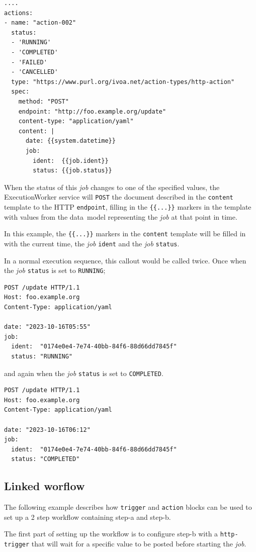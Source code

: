 \documentclass[11pt,a4paper]{ivoa}
\newcommand{\datamodel} {data~model}
\newcommand{\execworkerclass} {ExecutionWorker}
\newcommand{\codeword}[1] {\texttt{#1}}
\newcommand{\job} {\textit{job}}
\begin{document}
\begin{lstlisting}[]
....
actions:
- name: "action-002"
  status:
  - 'RUNNING'
  - 'COMPLETED'
  - 'FAILED'
  - 'CANCELLED'
  type: "https://www.purl.org/ivoa.net/action-types/http-action"
  spec:
    method: "POST"
    endpoint: "http://foo.example.org/update"
    content-type: "application/yaml"
    content: |
      date: {{system.datetime}}
      job:
        ident:  {{job.ident}}
        status: {{job.status}}
\end{lstlisting}

When the status of this \job{} changes to one of the specified values, the
\execworkerclass{} service will \codeword{POST} the document described in the
\codeword{content} template to the HTTP \codeword{endpoint}, filling in the \codeword{\{\{...\}\}}
markers in the template with values from the \datamodel{} representing the \job{}
at that point in time.

In this example, the \codeword{\{\{...\}\}} markers in the \codeword{content} template will be filled
in with the current time, the \job{} \codeword{ident} and the \job{} \codeword{status}.

In a normal execution sequence, this callout would be called twice. Once when the \job{} \codeword{status}
is set to \codeword{RUNNING};
\begin{lstlisting}[]
POST /update HTTP/1.1
Host: foo.example.org
Content-Type: application/yaml

date: "2023-10-16T05:55"
job:
  ident:  "0174e0e4-7e74-40bb-84f6-88d66dd7845f"
  status: "RUNNING"
\end{lstlisting}

and again when the \job{} \codeword{status} is set to \codeword{COMPLETED}.
\begin{lstlisting}[]
POST /update HTTP/1.1
Host: foo.example.org
Content-Type: application/yaml

date: "2023-10-16T06:12"
job:
  ident:  "0174e0e4-7e74-40bb-84f6-88d66dd7845f"
  status: "COMPLETED"
\end{lstlisting}

\subsection{Linked worflow}
\label{linked-workflow}

The following example describes how \codeword{trigger} and \codeword{action} blocks can be used to
set up a 2 step workflow containing step-a and step-b.

The first part of setting up the workflow is to configure step-b with a \codeword{http-trigger}
that will wait for a specific value to be posted before starting the \job{}.
\end{document}
